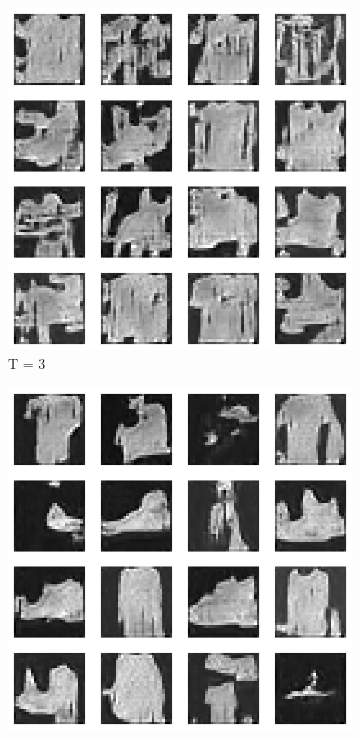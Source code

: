 \documentclass{article}
\begin{document}
\begin{figure}[H]
	\begin{subfigure}[h]{0.3\linewidth}
		\centering
		\includegraphics[scale=0.3]{../code/generated_DDGAN_rkl_3.png}
		\caption{T = 3}
	\end{subfigure}
	\hfill
	\begin{subfigure}[h]{0.3\linewidth}
		\centering
		\includegraphics[scale=0.3]{../code/generated_DDGAN_rkl_5.png}

\end{subfigure}
\end{figure}
\end{document}
